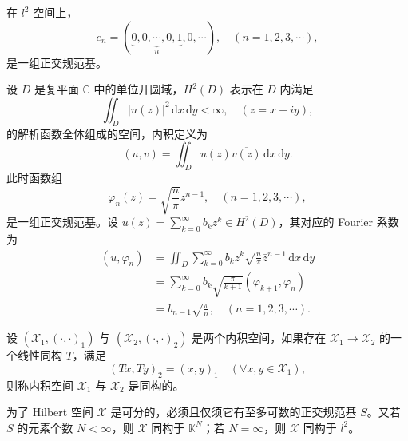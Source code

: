 \documentclass[lang=cn,newtx,10pt,scheme=chinese,thmcnt=chapter]{elegantbook}
\newcommand{\dif}{\mathrm{d}}
\begin{document}
\begin{example}
在 $l^2$ 空间上，
\begin{equation*}
e_n = (\underbrace{0, 0, \cdots, 0, 1}_n, 0, \cdots), \quad (n = 1, 2, 3, \cdots),
\end{equation*}
是一组正交规范基。
\end{example}

\begin{example}
设 $D$ 是复平面 $\mathbb{C}$ 中的单位开圆域，$H^2(D)$ 表示在 $D$ 内满足
\begin{equation*}
\iint_D |u(z)|^2 \, \dif x \, \dif y < \infty, \quad (z = x + i y),
\end{equation*}
的解析函数全体组成的空间，内积定义为
\begin{equation*}
(u, v) = \iint_D u(z) \overline{v(z)} \, \dif x \, \dif y.
\end{equation*}
此时函数组
\begin{equation*}
\varphi_n(z) = \sqrt{\frac{n}{\pi}} z^{n-1}, \quad (n = 1, 2, 3, \cdots),
\end{equation*}
是一组正交规范基。设 $u(z) = \sum_{k=0}^\infty b_k z^k \in H^2(D)$，其对应的 Fourier 系数为
\begin{equation*}
\begin{aligned}
\left(u, \varphi_n\right) 
&= \iint_D \sum_{k=0}^\infty b_k z^k \sqrt{\frac{n}{\pi}} \bar{z}^{n-1} \, \dif x \, \dif y \\
&= \sum_{k=0}^\infty b_k \sqrt{\frac{\pi}{k+1}} \left(\varphi_{k+1}, \varphi_n\right) \\
&= b_{n-1} \sqrt{\frac{\pi}{n}}, \quad (n = 1, 2, 3, \cdots).
\end{aligned}
\end{equation*}
\end{example}
\begin{definition}
设 $\left( \mathscr{X} _1, (\cdot, \cdot)_1 \right)$ 与 $\left( \mathscr{X} _2, (\cdot, \cdot)_2 \right)$ 是两个内积空间，如果存在 $\mathscr{X} _1 \rightarrow \mathscr{X} _2$ 的一个线性同构 $T$，满足
\begin{equation*}
(Tx, Ty)_2 = (x, y)_1 \quad (\forall x, y \in \mathscr{X}_1),
\end{equation*}
则称内积空间 $\mathscr{X}_1$ 与 $\mathscr{X}_2$ 是同构的。
\end{definition}

\begin{theorem}
为了 Hilbert 空间 $\mathscr{X}$ 是可分的，必须且仅须它有至多可数的正交规范基 $S$。又若 $S$ 的元素个数 $N < \infty$，则 $\mathscr{X}$ 同构于 $\mathbb{K}^N$；若 $N = \infty$，则 $\mathscr{X}$ 同构于 $l^2$。
\end{theorem}
\end{document}
